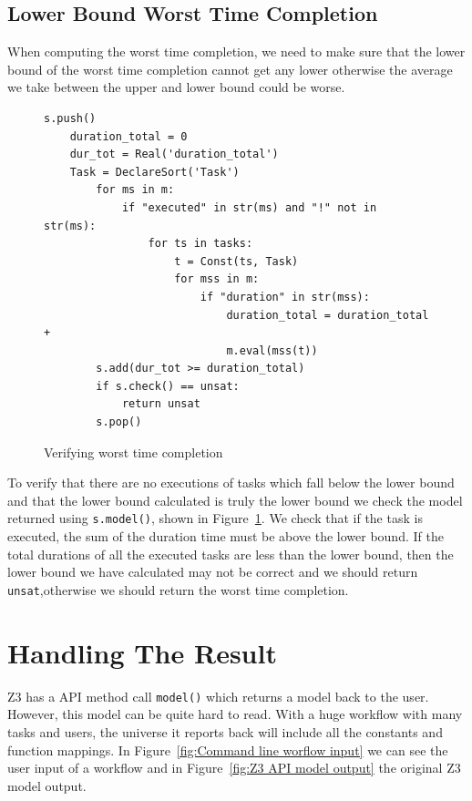 \documentclass[a4paper]{report}
\begin{document}
\subsection{Lower Bound Worst Time Completion}
When computing the worst time completion, we need to make sure that the lower bound of the worst time completion cannot get any lower otherwise the average we take between the upper and lower bound could be worse.

\begin{figure}[!h]
\lstset{numbers=left, showspaces=false,
    showstringspaces=false, tabsize=2, breaklines=true,
    xleftmargin=5.0ex,
}
\begin{lstlisting}[frame=single]
s.push()
	duration_total = 0
	dur_tot = Real('duration_total')
	Task = DeclareSort('Task')
		for ms in m:
			if "executed" in str(ms) and "!" not in str(ms):
				for ts in tasks:
					t = Const(ts, Task)
					for mss in m:
						if "duration" in str(mss):
							duration_total = duration_total + 
							m.eval(mss(t))
		s.add(dur_tot >= duration_total)
		if s.check() == unsat:
			return unsat
		s.pop()
\end{lstlisting}
\caption{Verifying worst time completion}
\label{fig:Verifying worst time completion}
\end{figure}

To verify that there are no executions of tasks which fall below the lower bound and that the lower bound calculated is truly the lower bound we check the model returned using \texttt{s.model()}, shown in Figure~\ref{fig:Verifying worst time completion}. We check that if the task is executed, the sum of the duration time must be above the lower bound. If the total durations of all the executed tasks are less than the lower bound, then the lower bound we have calculated may not be correct and we should return \texttt{unsat},otherwise we should return the worst time completion. \\

\section{Handling The Result}
Z3 has a API method call \texttt{model()} which returns a model back to the user. However, this model can be quite hard to read. With a huge workflow with many tasks and users, the universe it reports back will include all the constants and function mappings. In Figure~\ref{fig:Command line worflow input} we can see the user input of a workflow and in Figure~\ref{fig:Z3 API model output} the original Z3 model output. 
\end{document}
